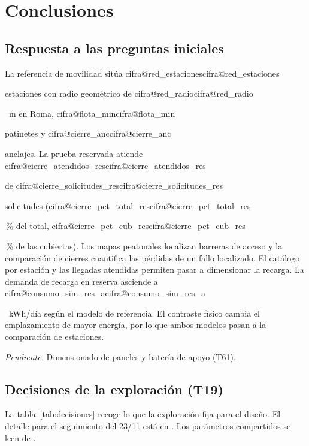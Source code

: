 \documentclass[11pt,a4paper]{article}
\makeatletter
\newcommand\cifra[1]{\ifcsname cifra@#1\endcsname\csname cifra@#1\endcsname
  \else\PackageError{memoria}{Cifra desconocida: \detokenize{#1}}{Revisa generar_cifras.py}\fi}
\newcommand\pc{\,\%}
\newcommand\pendiente[1]{{\color{tenue}\small\textit{Pendiente.} #1\par}}
\makeatother
\begin{document}
\section{Conclusiones}

\subsection{Respuesta a las preguntas iniciales}
La referencia de movilidad sitúa \cifra{red_estaciones} estaciones con radio
geométrico de \cifra{red_radio}~m en Roma, \cifra{flota_min} patinetes y
\cifra{cierre_anc} anclajes. La prueba reservada atiende
\cifra{cierre_atendidos_res} de \cifra{cierre_solicitudes_res} solicitudes
(\cifra{cierre_pct_total_res}\pc{} del total, \cifra{cierre_pct_cub_res}\pc{}
de las cubiertas). Los mapas peatonales localizan barreras de acceso y
la comparación de cierres cuantifica las pérdidas de un fallo localizado.
El catálogo por estación y las llegadas atendidas permiten pasar a
dimensionar la recarga.
La demanda de recarga en reserva asciende a \cifra{consumo_sim_res_a}~kWh/día
según el modelo de referencia. El contraste físico cambia el emplazamiento
de mayor energía, por lo que ambos modelos pasan a la comparación de estaciones.
\pendiente{Dimensionado de paneles y batería de apoyo (T61).}

\subsection{Decisiones de la exploración (T19)}
La tabla~\ref{tab:decisiones} recoge lo que la exploración fija para el diseño. El
detalle para el seguimiento del 23/11 está en . Los
parámetros compartidos se leen de .
\end{document}
